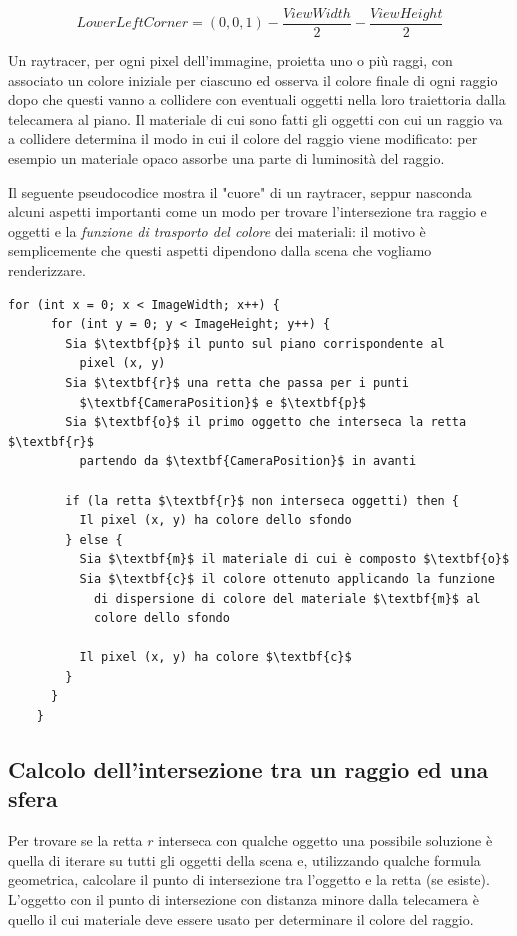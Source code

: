 \documentclass[12pt, twoside]{article}
\begin{document}
$$
  LowerLeftCorner = (0, 0, 1) - \frac{ViewWidth}{2} - \frac{ViewHeight}{2}
$$

Un raytracer, per ogni pixel dell'immagine, proietta uno o più raggi, con
associato un colore iniziale per ciascuno ed osserva il colore finale di
ogni raggio dopo che questi vanno a collidere con eventuali oggetti nella
loro traiettoria dalla telecamera al piano.
Il materiale di cui sono fatti gli oggetti con cui un raggio va a collidere
determina il modo in cui il colore del raggio viene modificato: per esempio un
materiale opaco assorbe una parte di luminosità del raggio.

Il seguente pseudocodice mostra il "cuore" di un raytracer, seppur nasconda
alcuni aspetti importanti come un modo per trovare l'intersezione tra raggio
e oggetti e la \textit{funzione di trasporto del colore} dei materiali: il
motivo è semplicemente che questi aspetti dipendono dalla scena che vogliamo
renderizzare.

\newpage

\begin{lstlisting}[mathescape=true]
    for (int x = 0; x < ImageWidth; x++) {
      for (int y = 0; y < ImageHeight; y++) {
        Sia $\textbf{p}$ il punto sul piano corrispondente al
          pixel (x, y)
        Sia $\textbf{r}$ una retta che passa per i punti
          $\textbf{CameraPosition}$ e $\textbf{p}$
        Sia $\textbf{o}$ il primo oggetto che interseca la retta $\textbf{r}$
          partendo da $\textbf{CameraPosition}$ in avanti

        if (la retta $\textbf{r}$ non interseca oggetti) then {
          Il pixel (x, y) ha colore dello sfondo
        } else {
          Sia $\textbf{m}$ il materiale di cui è composto $\textbf{o}$
          Sia $\textbf{c}$ il colore ottenuto applicando la funzione
            di dispersione di colore del materiale $\textbf{m}$ al
            colore dello sfondo
          
          Il pixel (x, y) ha colore $\textbf{c}$
        }
      }
    }
\end{lstlisting}

\subsection{Calcolo dell'intersezione tra un raggio ed una sfera}
Per trovare se la retta $r$ interseca con qualche oggetto una possibile
soluzione è quella di iterare su tutti gli oggetti della scena e, utilizzando
qualche formula geometrica, calcolare il punto di intersezione tra l'oggetto
e la retta (se esiste).
L'oggetto con il punto di intersezione con distanza minore dalla telecamera è
quello il cui materiale deve essere usato per determinare il colore del raggio.
\end{document}
